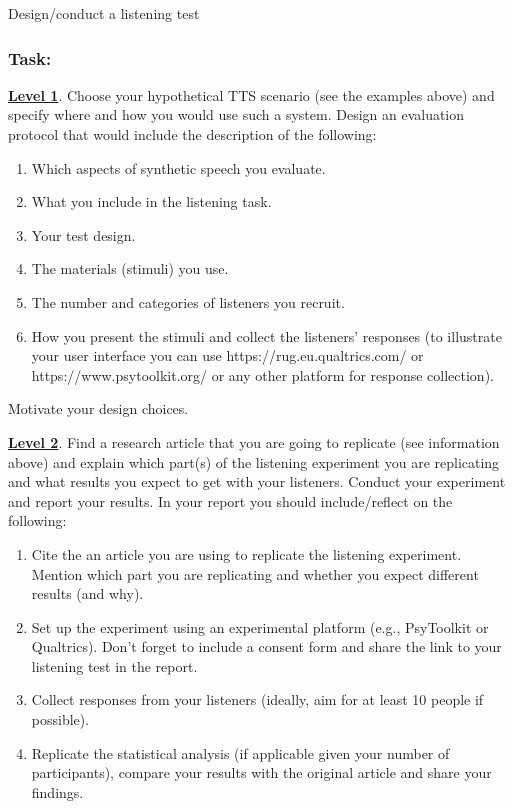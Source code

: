 \documentclass{../labbook}
\begin{document}
\begin{problem}{1}{10}{Design/conduct a listening test}

\subsubsection*{Task:}
\noindent \underline{\textbf{Level 1}}. Choose your hypothetical TTS scenario (see the examples above) and specify where and how you would use such a system. Design an evaluation protocol that would include the description of the following:

\begin{enumerate}
    \item Which aspects of synthetic speech you evaluate.
    \item What you include in the listening task.
    \item Your test design.
    \item The materials (stimuli) you use.
    \item The number and categories of listeners you recruit.
    \item How you present the stimuli and collect the listeners’ responses (to illustrate your user interface you can use https://rug.eu.qualtrics.com/ or https://www.psytoolkit.org/ or any other platform for response collection).
\end{enumerate}

Motivate your design choices.

\smallskip

\noindent \underline{\textbf{Level 2}}. Find a research article that you are going to replicate (see information above) and explain which part(s) of the listening experiment you are replicating and what results you expect to get with your listeners. Conduct your experiment and report your results. In your report you should include/reflect on the following:
\begin{enumerate}
    \item Cite the an article you are using to replicate the listening experiment. Mention which part you are replicating and whether you expect different results (and why).
    \item Set up the experiment using an experimental platform (e.g., PsyToolkit or Qualtrics). Don't forget to include a consent form and share the link to your listening test in the report.
    \item Collect responses from your listeners (ideally, aim for at least 10 people if possible).
    \item Replicate the statistical analysis (if applicable given your number of participants), compare your results with the original article and share your findings.
\end{enumerate}



\end{problem}
\end{document}
